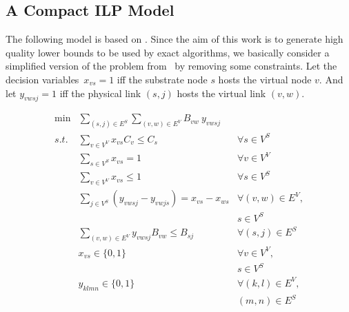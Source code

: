 \documentclass[conference]{IEEEtran}
\begin{document}
\subsection{A Compact ILP Model}
\label{sec:ILPmodel}
The following model is based on \cite{Alkmim2013}. Since the aim of this work is to generate high quality lower bounds to be used by exact algorithms, we basically consider a simplified version of the problem from~\cite{Alkmim2013} by removing some constraints.
Let the decision variables~$x_{vs} = 1$ iff the substrate node $s$ hosts the virtual node $v$. And let $y_{vwsj} = 1$ iff the physical link $(s,j)$ hosts the virtual link $(v,w)$.

\begin{align}
     \min & \sum\limits_{(s,j) \in E^{S}} \sum\limits_{(v,w) \in E^{V}} B_{vw}~ y_{vwsj} & \nonumber \\
    s.t. & \sum\limits_{v \in V^{V}} x_{vs} C_{v} \leq C_{s}                                   & \forall s \in V^{S}  \label{eq:flowcap} \\
         & \sum\limits_{s \in V^{S}} x_{vs} = 1                                                & \forall v \in V^{V}  \label{eq:flowvirone}\\
         & \sum\limits_{v \in V^{V}} x_{vs} \leq 1                                             & \forall s \in V^{S} \label{eq:flowsubone} \\
         & \sum\limits_{j \in V^{S}} ( y_{vwsj} - y_{vwjs}) = x_{vs} - x_{ws} & \forall (v,w) \in E^{V}, \nonumber \\ 
         &                                                                    & s \in V^{S} \label{eq:flowflow} \\
         & \sum\limits_{(v,w) \in E^{V}} y_{vwsj} B_{vw}  \leq B_{sj}                 & \forall (s,j) \in E^{S} \label{eq:flowbandwidth} \\
         & x_{vs} \in \{0,1\}                                                                  & \forall v \in V^{V}, \nonumber \\
         &                                                                                      & s \in V^{S} \\
         & y_{klmn} \in \{0,1\}                                                         & \forall (k,l) \in E^{V}, \nonumber \\
         &                                                                                 & (m,n) \in E^{S}
\end{align} 
\end{document}
